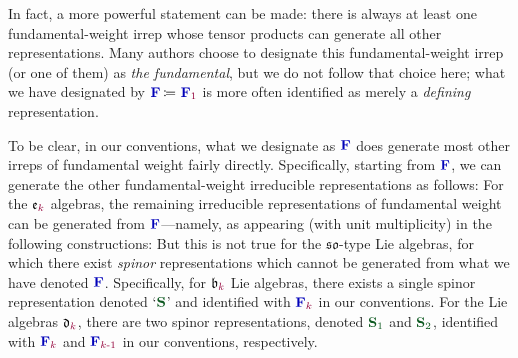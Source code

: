 \documentclass[12pt,a4paper]{article}\let\ifpdf\relax
\begin{document}
In fact, a more powerful statement can be made: there is always at least one fundamental-weight irrep whose tensor products can generate all other representations. Many authors choose to designate this fundamental-weight irrep (or one of them) as \emph{the fundamental}, but we do not follow that choice here; what we have designated by $\mathbf{\b{F}}\equivR\mathbf{\b{F}}_{\r{1}}$ is more often identified as merely a \emph{defining} representation. 

\newpage 
To be clear, in our conventions, what we designate as $\mathbf{\b{F}}$ does generate most other irreps of fundamental weight fairly directly. Specifically, starting from $\mathbf{\b{F}}$, we can generate the other fundamental-weight irreducible representations as follows:
%
%
For the $\mathfrak{e}_{\r{k}}$ algebras, the remaining irreducible representations of fundamental weight can be generated from $\mathbf{\b{F}}$---namely, as appearing (with unit multiplicity) in the following constructions:
%
%
But this is not true for the $\mathfrak{so}$-type Lie algebras, for which there exist \emph{spinor} representations which cannot be generated from what we have denoted $\mathbf{\b{F}}$. Specifically, for $\mathfrak{b}_{\r{k}}$ Lie algebras, there exists a single spinor representation denoted `$\mathbf{\g{S}}$' and identified with $\mathbf{\b{F}}_{\r{k}}$ in our conventions. For the Lie algebras $\mathfrak{d}_{\r{k}}$, there are two spinor representations, denoted $\mathbf{\g{S}}_{\g{1}}$ and $\mathbf{\g{S}}_{\g{2}}$, identified with $\mathbf{\b{F}}_{\r{k}}$ and $\mathbf{\b{F}}_{\r{k\text{-}1}}$ in our conventions, respectively. 
\end{document}

